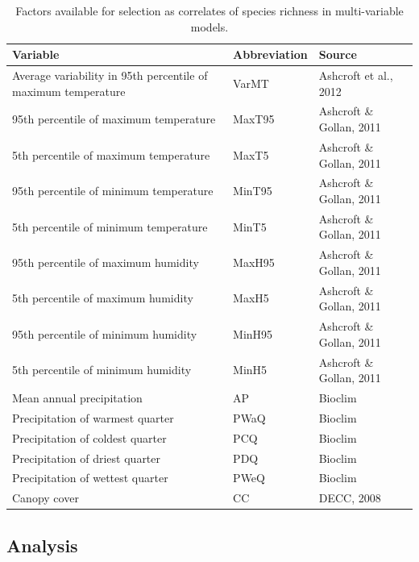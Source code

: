 \begin{flushleft}
\begin{table}
\renewcommand{\arraystretch}{1.2}
\caption{\footnotesize Factors available for selection as correlates of species richness in multi-variable models.}
\scriptsize
\begin{tabular}{m{3.4in}m{0.7in}m{1.3in}}
\hline
Variable &
Abbreviation &
Source\\\hline
Average variability in 95th percentile of maximum temperature &
VarMT &
Ashcroft et al., 2012\\
95th percentile of maximum temperature &
MaxT95 &
Ashcroft \& Gollan, 2011\\
5th percentile of maximum temperature &
MaxT5 &
Ashcroft \& Gollan, 2011\\
95th percentile of minimum temperature &
MinT95 &
Ashcroft \& Gollan, 2011\\
5th percentile of minimum temperature &
MinT5 &
Ashcroft \& Gollan, 2011\\
95th percentile of maximum humidity &
MaxH95 &
Ashcroft \& Gollan, 2011\\
5th percentile of maximum humidity &
MaxH5 &
Ashcroft \& Gollan, 2011\\
95th percentile of minimum humidity &
MinH95 &
Ashcroft \& Gollan, 2011\\
5th percentile of minimum humidity &
MinH5 &
Ashcroft \& Gollan, 2011\\
Mean annual precipitation &
AP &
Bioclim\\
Precipitation of warmest quarter &
PWaQ &
Bioclim\\
Precipitation of coldest quarter &
PCQ &
Bioclim\\
Precipitation of driest quarter &
PDQ &
Bioclim\\
Precipitation of wettest quarter &
PWeQ &
Bioclim\\
Canopy cover &
CC &
DECC, 2008\\\hline
\end{tabular}
\label{tab:vars}
\end{table}
\end{flushleft}

\subsection{Analysis}

